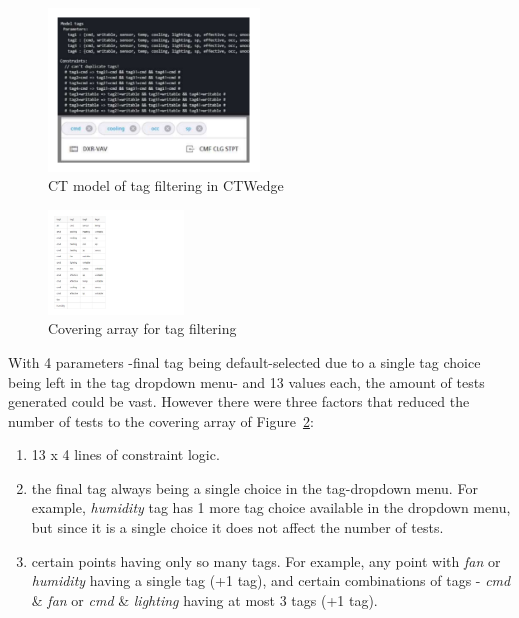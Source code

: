 \documentclass[conference]{IEEEtran}
\begin{document}
	\begin{figure}[!ht]
		\includegraphics[width=0.50\textwidth,]{tagFilterModel.pdf}
		\caption{CT model of tag filtering in CTWedge}
		\label{fig:tagFilterModel}
	\end{figure}

	\begin{figure}[!ht]
		\centering
		\includegraphics[width=0.32\textwidth,]{tagFilterCoveringArray.pdf}
		\caption{Covering array for tag filtering}
		\label{fig:tagFilterCoveringArray}
	\end{figure}


	With 4 parameters -final tag being default-selected due to a single tag choice being left in the tag dropdown menu- and 13 values each, the amount of tests generated could be vast. 
	However there were three factors that reduced the number of tests to the covering array of Figure~\ref{fig:tagFilterCoveringArray}:
	
	\begin{enumerate}
		\item 13 x 4 lines of constraint logic.
		\item the final tag always being a single choice in the tag-dropdown menu. For example, \textit{humidity} tag has 1 more tag choice available in the dropdown menu, but since it is a single choice it does not affect  the number of tests.
		\item certain points having only so many tags. For example, any point with \textit{fan} or \textit{humidity} having a single tag (+1 tag), and certain combinations of tags - \textit{cmd} \& \textit{fan} or \textit{cmd} \& \textit{lighting} having at most 3 tags (+1 tag).
	\end{enumerate}
\end{document}
